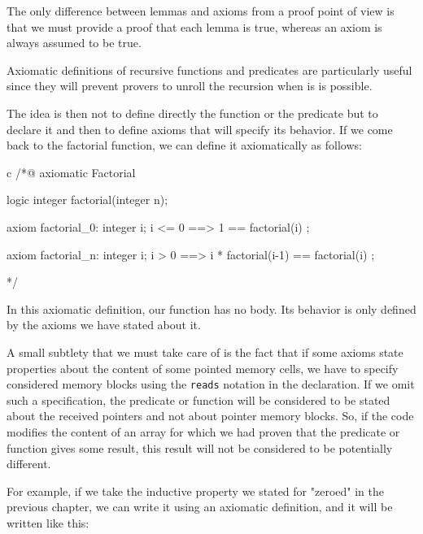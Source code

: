 The only difference between lemmas and axioms from a proof point of view
is that we must provide a proof that each lemma is true, whereas an
axiom is always assumed to be true.





Axiomatic definitions of recursive functions and predicates are
particularly useful since they will prevent provers to unroll the
recursion when is is possible.



The idea is then not to define directly the function or the predicate
but to declare it and then to define axioms that will specify its
behavior. If we come back to the factorial function, we can define it
axiomatically as follows:



\begin{CodeBlock}{c}
/*@
  axiomatic Factorial{
    logic integer factorial(integer n);
    
    axiom factorial_0:
      \forall integer i; i <= 0 ==> 1 == factorial(i) ;

    axiom factorial_n:
      \forall integer i; i > 0 ==> i * factorial(i-1) == factorial(i) ;
  }
*/
\end{CodeBlock}



In this axiomatic definition, our function has no body. Its
behavior is only defined by the axioms we have stated about it.



A small subtlety that we must take care of is the fact that if some
axioms state properties about the content of some pointed memory cells,
we have to specify considered memory blocks using the \texttt{reads}
notation in the declaration. If we omit such a specification, the
predicate or function will be considered to be stated about the received
pointers and not about pointer memory blocks. So, if the code modifies
the content of an array for which we had proven that the predicate or
function gives some result, this result will not be considered to be
potentially different.



For example, if we take the inductive property we stated for "zeroed" in the
previous chapter, we can write it using an axiomatic definition, and it will be
written like this:






